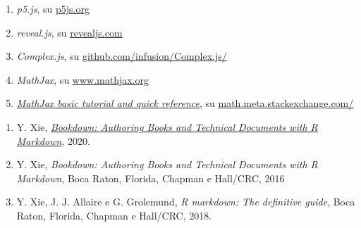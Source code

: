 \documentclass[
]{book}
\providecommand{\tightlist}{%
  \setlength{\itemsep}{0pt}\setlength{\parskip}{0pt}}
\begin{document}
\begin{enumerate}
\def\labelenumi{\arabic{enumi}.}
\setcounter{enumi}{7}
\tightlist
\item
  \emph{p5.js}, su \href{https://p5js.org}{p5js.org}
\item
  \emph{reveal.js}, su \href{https://revealjs.com}{revealjs.com}
\item
  \emph{Complex.js}, su \href{https://github.com/infusion/Complex.js}{github.com/infusion/Complex.js/}
\item
  \emph{MathJax}, su \href{https://www.mathjax.org/}{www.mathjax.org}
\item
  \href{https://math.meta.stackexchange.com/questions/5020/mathjax-basic-tutorial-and-quick-reference}{\emph{MathJax basic tutorial and quick reference}}, su \href{https://math.meta.stackexchange.com/}{math.meta.stackexchange.com/}
\end{enumerate}

\begin{enumerate}
\def\labelenumi{\arabic{enumi}.}
\setcounter{enumi}{12}
\tightlist
\item
  Y. Xie, \href{https://bookdown.org/yihui/bookdown/}{\emph{Bookdown: Authoring Books and Technical Documents with R Markdown}}, 2020.
\item
  Y. Xie, \emph{Bookdown: Authoring Books and Technical Documents with R Markdown}, Boca Raton, Florida, Chapman e Hall/CRC, 2016
\item
  Y. Xie, J. J. Allaire e G. Grolemund, \emph{R markdown: The definitive guide}, Boca Raton, Florida, Chapman e Hall/CRC, 2018.
\end{enumerate}
\end{document}
